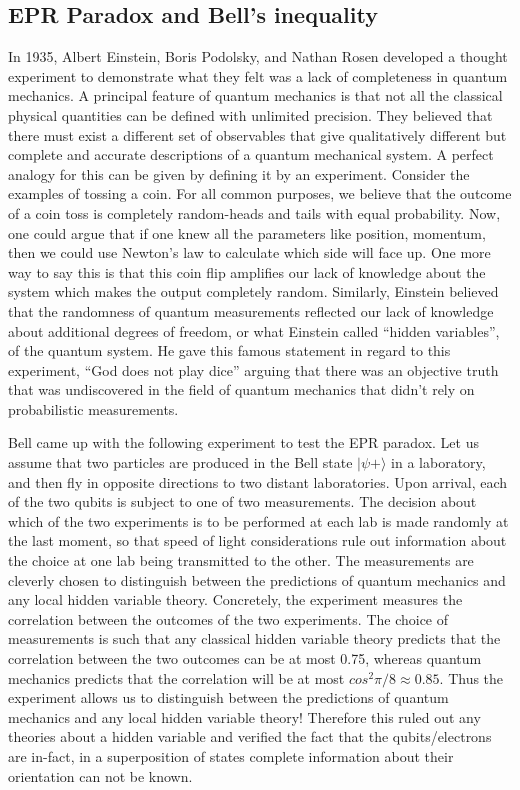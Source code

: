 \subsection {EPR Paradox and  Bell's inequality}
In 1935, Albert Einstein, Boris Podolsky, and Nathan Rosen developed a thought experiment to demonstrate what they felt was a lack of completeness in quantum mechanics. A principal feature of quantum mechanics is that not all the classical physical quantities can be defined with unlimited precision. They believed that there must exist a different set of observables that give qualitatively different but complete and accurate descriptions of a quantum mechanical system. A perfect analogy for this can be given by defining it by an experiment.
Consider the examples of tossing a coin. For all common purposes, we believe that the outcome of a coin toss is completely random-heads and tails with equal probability. Now, one could argue that if one knew all the parameters like position, momentum, then we could use Newton’s law to calculate which side will face up. One more way to say this is that this coin flip amplifies our lack of knowledge about the system which makes the output completely random. Similarly, Einstein believed that the randomness of quantum measurements reflected our lack of knowledge about additional degrees of freedom, or what Einstein called “hidden variables”, of the quantum system. He gave this famous statement in regard to this experiment, “God does not play dice” arguing that there was an objective truth that was undiscovered in the field of quantum mechanics that didn’t rely on probabilistic measurements.

Bell came up with the following experiment to test the EPR paradox. Let us assume that two particles are produced in the Bell state $|\psi+\rangle$  in a laboratory, and then fly in opposite directions to two distant laboratories. Upon arrival, each of the two qubits is subject to one of two measurements. The decision about which of the two experiments is to be performed at each lab is made randomly at the last moment, so that speed of light considerations rule out information about the choice at one lab being transmitted to the other. The measurements are cleverly chosen to distinguish between the predictions of quantum mechanics and any local hidden variable theory. Concretely, the experiment measures the correlation between the outcomes of the two experiments. The choice of measurements is such that any classical hidden variable theory predicts that the correlation between the two outcomes can be at most 0.75, whereas quantum mechanics predicts that the correlation will be at most $cos^2 \pi/8≈0.85$. Thus the experiment allows us to distinguish between the predictions of quantum mechanics and any local hidden variable theory! Therefore this ruled out any theories about a hidden variable and verified the fact that the qubits/electrons are in-fact, in a superposition of states complete information about their orientation can not be known.